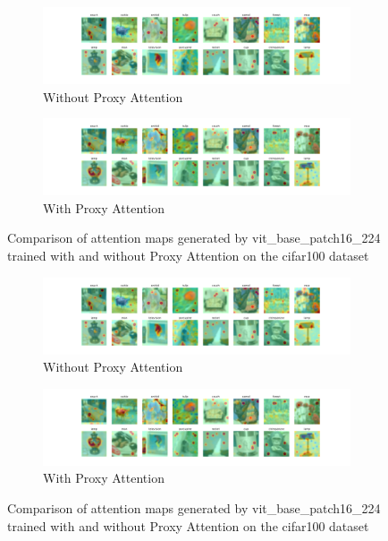 
    \begin{figure}[H]
        \centering
        \begin{subfigure}[b]{1\textwidth}
            \includegraphics[width=\textwidth]{images/cifar100_vit_base_patch16_224_noproxy_0.pdf}
            \caption{Without Proxy Attention}
        \end{subfigure}
        \hfill
        \begin{subfigure}[b]{1\textwidth}
            \includegraphics[width=\textwidth]{images/cifar100_vit_base_patch16_224_proxy_0.pdf}
            \caption{With Proxy Attention}
        \end{subfigure}
        \caption{Comparison of attention maps generated by vit\_base\_patch16\_224 trained with and without Proxy Attention on the cifar100 dataset}
    \end{figure}
    

    \begin{figure}[H]
        \centering
        \begin{subfigure}[b]{1\textwidth}
            \includegraphics[width=\textwidth]{images/cifar100_vit_base_patch16_224_noproxy_0.pdf}
            \caption{Without Proxy Attention}
        \end{subfigure}
        \hfill
        \begin{subfigure}[b]{1\textwidth}
            \includegraphics[width=\textwidth]{images/cifar100_vit_base_patch16_224_proxy_0.pdf}
            \caption{With Proxy Attention}
        \end{subfigure}
        \caption{Comparison of attention maps generated by vit\_base\_patch16\_224 trained with and without Proxy Attention on the cifar100 dataset}
    \end{figure}
    

